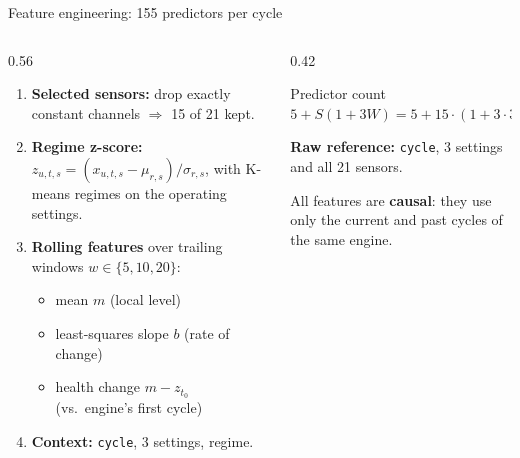 \documentclass[aspectratio=169,11pt]{beamer}
\begin{document}
\begin{frame}{Feature engineering: 155 predictors per cycle}
  \small
  \begin{columns}[T]
    \begin{column}{0.56\textwidth}
      \begin{enumerate}
        \item \textbf{Selected sensors:} drop exactly constant channels
          $\Rightarrow$ 15 of 21 kept.
        \item \textbf{Regime z-score:}
          $z_{u,t,s}=(x_{u,t,s}-\mu_{r,s})/\sigma_{r,s}$, with K-means regimes
          on the operating settings.
        \item \textbf{Rolling features} over trailing windows
          $w\in\{5,10,20\}$:
          \begin{itemize}
            \item mean $m$ (local level)
            \item least-squares slope $b$ (rate of change)
            \item health change $m-z_{t_0}$ (vs.\ engine's first cycle)
          \end{itemize}
        \item \textbf{Context:} \texttt{cycle}, 3 settings, regime.
      \end{enumerate}
    \end{column}
    \begin{column}{0.42\textwidth}
      \begin{block}{Predictor count}
        $5 + S(1+3W) = 5 + 15\cdot(1+3\cdot3) = 155$
      \end{block}
      \vspace{0.4em}
      \textbf{Raw reference:} \texttt{cycle}, 3 settings and all 21 sensors.
      \vspace{0.4em}

      All features are \textbf{causal}: they use only the current and past
      cycles of the same engine.
    \end{column}
  \end{columns}
\end{frame}
\end{document}
